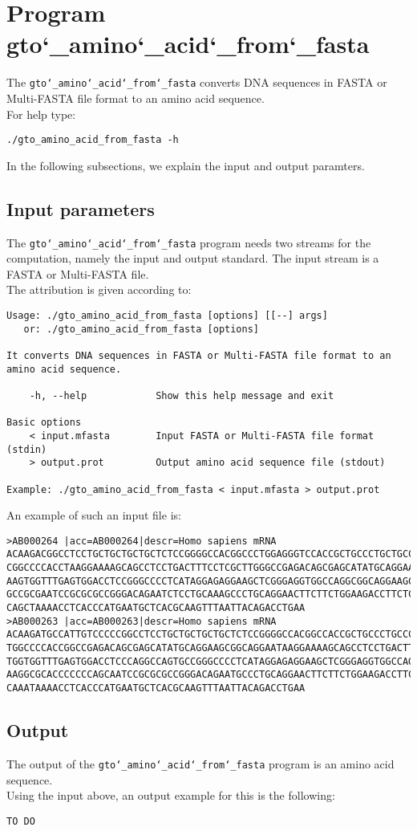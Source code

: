 \section{Program gto\char`_amino\char`_acid\char`_from\char`_fasta}
The \texttt{gto\char`_amino\char`_acid\char`_from\char`_fasta} converts DNA sequences in FASTA or Multi-FASTA file format to an amino acid sequence.\\
For help type:
\begin{lstlisting}
./gto_amino_acid_from_fasta -h
\end{lstlisting}
In the following subsections, we explain the input and output paramters.

\subsection*{Input parameters}

The \texttt{gto\char`_amino\char`_acid\char`_from\char`_fasta} program needs two streams for the computation, namely the input and output standard. The input stream is a FASTA or Multi-FASTA file.\\
The attribution is given according to:
\begin{lstlisting}
Usage: ./gto_amino_acid_from_fasta [options] [[--] args]
   or: ./gto_amino_acid_from_fasta [options]

It converts DNA sequences in FASTA or Multi-FASTA file format to an amino acid sequence.

    -h, --help            Show this help message and exit

Basic options
    < input.mfasta        Input FASTA or Multi-FASTA file format (stdin)
    > output.prot         Output amino acid sequence file (stdout)

Example: ./gto_amino_acid_from_fasta < input.mfasta > output.prot
\end{lstlisting}
An example of such an input file is:
\begin{lstlisting}
>AB000264 |acc=AB000264|descr=Homo sapiens mRNA 
ACAAGACGGCCTCCTGCTGCTGCTGCTCTCCGGGGCCACGGCCCTGGAGGGTCCACCGCTGCCCTGCTGCCATTGTCCC
CGGCCCCACCTAAGGAAAAGCAGCCTCCTGACTTTCCTCGCTTGGGCCGAGACAGCGAGCATATGCAGGAAGCGGCAGG
AAGTGGTTTGAGTGGACCTCCGGGCCCCTCATAGGAGAGGAAGCTCGGGAGGTGGCCAGGCGGCAGGAAGCAGGCCAGT
GCCGCGAATCCGCGCGCCGGGACAGAATCTCCTGCAAAGCCCTGCAGGAACTTCTTCTGGAAGACCTTCTCCACCCCCC
CAGCTAAAACCTCACCCATGAATGCTCACGCAAGTTTAATTACAGACCTGAA
>AB000263 |acc=AB000263|descr=Homo sapiens mRNA 
ACAAGATGCCATTGTCCCCCGGCCTCCTGCTGCTGCTGCTCTCCGGGGCCACGGCCACCGCTGCCCTGCCCCTGGAGGG
TGGCCCCACCGGCCGAGACAGCGAGCATATGCAGGAAGCGGCAGGAATAAGGAAAAGCAGCCTCCTGACTTTCCTCGCT
TGGTGGTTTGAGTGGACCTCCCAGGCCAGTGCCGGGCCCCTCATAGGAGAGGAAGCTCGGGAGGTGGCCAGGCGGCAGG
AAGGCGCACCCCCCCAGCAATCCGCGCGCCGGGACAGAATGCCCTGCAGGAACTTCTTCTGGAAGACCTTCTCCTCCTG
CAAATAAAACCTCACCCATGAATGCTCACGCAAGTTTAATTACAGACCTGAA
\end{lstlisting}

\subsection*{Output}

The output of the \texttt{gto\char`_amino\char`_acid\char`_from\char`_fasta} program is an amino acid sequence.\\
Using the input above, an output example for this is the following:
\begin{lstlisting}
TO DO
\end{lstlisting}
